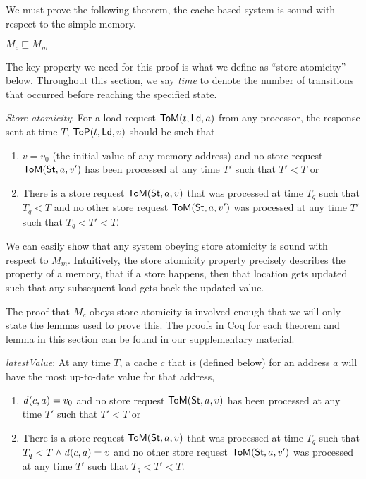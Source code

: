 We must prove the following theorem, \ie{} the cache-based system is sound with
respect to the simple memory.
\begin{theorem}
\label{ccorrect}
$M_c \sqsubseteq M_m$
\end{theorem}

The key property we need for this proof is what we define as
``store atomicity'' below. Throughout this section, we say
\emph{time} to denote the number of transitions that occurred before reaching
the specified state.

\begin{defn}
\textit{Store atomicity}:
For a load request $\mathsf{ToM}(t, \mathsf{Ld}, a)$
from any processor, the response sent at time $T$,
$\mathsf{ToP}(t, \mathsf{Ld}, v)$ should be such that
\begin{enumerate}
\item $v = v_0$ (the initial value of any memory address) and no store
  request $\mathsf{ToM}(\mathsf{St}, a, v')$ has been processed at any time $T'$ such
  that $T' < T$ or
\item There is a store request $\mathsf{ToM}(\mathsf{St}, a, v)$ that was processed at time $T_q$ such that
$T_q < T$ and no other store
request $\mathsf{ToM}(\mathsf{St}, a, v')$ was processed at any time $T'$ such that $T_q < T' < T$.
\end{enumerate}
\label{sa}
\end{defn}

We can easily show that any system obeying store atomicity is sound with
respect to $M_m$. Intuitively, the store atomicity property precisely describes
the property of a memory, \viz{} that if a store happens, then that location
gets updated such that any subsequent load gets back the updated value.

The proof that $M_c$ obeys store atomicity is involved enough that we will only
state the lemmas used to prove this. The proofs in Coq for each theorem and
lemma in this section can be found in our supplementary material.

\begin{lemma}
\textit{latestValue}:
At any time $T$, a cache $c$ that is \clean{} (defined below) for an address
$a$ will have the most up-to-date value for that address, \ie{}
\begin{enumerate}
\item $\mathit{d}(c,a) = v_0$ and no store request $\mathsf{ToM}(\mathsf{St}, a, v)$ has been processed at
any time $T'$ such that $T' < T$ or
\item There is a store request $\mathsf{ToM}(\mathsf{St}, a, v)$ that was processed at time $T_q$ such that
$T_q < T \wedge \mathit{d}(c,a) = v$ and no other store
request $\mathsf{ToM}(\mathsf{St}, a, v')$ was processed at any time $T'$ such that $T_q < T' < T$.
\end{enumerate}
\label{latestValue}
\end{lemma}

